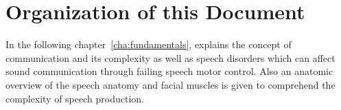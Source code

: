 \section{Organization of this Document}

In the following chapter~\ref{cha:fundamentals}, explains the concept of communication and its complexity as well as speech disorders which can affect sound communication through failing speech motor control. Also an anatomic overview of the speech anatomy and facial muscles is given to comprehend the complexity of speech production.












\begin{comment}
The goal of this thesis is to analyze facial activity, produced by speech therapy exercises and facial paralysis exercises, recorded by RGB, depth, and infrared cameras during several therapy sessions in order to develop a clinical decision support system that uses multimodal data to support health professionals in their decisions through exercise suggestions.

As seen in Fig.~\ref{fig:project}, the scope of this work is limited on exploring feature representations for video data and introducing text information into the machine learning framework, which is also part of this thesis, in order to represent progress done by the patient on different time instants (temporal modeling). In the following, the milestones to reach the goal of this thesis will be presented and explained. \\

\textbf{Hypothesis 1 -} A direct mapping between speech (US English and/or Portuguese) and facial muscle contraction can be made using data collected from RGB, depth, and infrared cameras by differentiating facial activity caused by speech from facial activity caused by facial expressions.


\textbf{Hypothesis 2 -} 

Considering clinical medical data existing in the Electronic Health Records, in particular, multimodal time series of data from health sensors and medical notes collected at each patient visit, we wish to recognize health/clinical patterns to support health professionals in their decisions through (i) suggestions and (ii) similar examples.

\end{comment}
